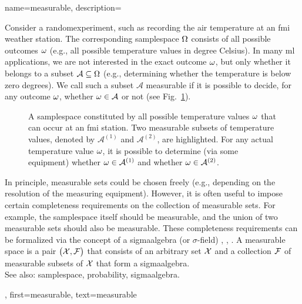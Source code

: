 {name={measurable}, 
	description={Consider a \gls{randomexperiment}, such as recording 
	the air temperature at an \gls{fmi} weather station. The corresponding \gls{samplespace} 
	$\Omega$ consists of all possible outcomes $\omega$ (e.g., 
		all possible temperature values in degree Celsius). In many \gls{ml} 
		applications, we are not interested in the exact outcome $\omega$, but only 
		whether it belongs to a subset $\mathcal{A} \subseteq \Omega$ 
		(e.g., determining whether the temperature is below zero degrees). 
		We call such a subset $\mathcal{A}$ measurable if it is possible to 
		decide, for any outcome $\omega$, whether $\omega \in \mathcal{A}$ 
		or not (see Fig.\ \ref{fig_measurable_dict}). \\
		\begin{figure}[H]
		\begin{center}
			\vspace*{10mm}
			\end{center}
			\caption{A \gls{samplespace} constituted by all possible temperature values $\omega$ 
			that can occur at an \gls{fmi} station. Two measurable subsets of temperature 
			values, denoted by $\mathcal{A}^{(1)}$ and $\mathcal{A}^{(2)}$, are highlighted. For any 
			actual temperature value $\omega$, it is possible to determine (via some equipment) 
			whether $\omega \in \mathcal{A}^{(1)}$ and whether $\omega \in \mathcal{A}^{(2)}$. \label{fig_measurable_dict}} 
		\end{figure}
		In principle, measurable sets could be chosen freely (e.g., depending on the resolution of the 
		measuring equipment). However, it is often useful to impose certain completeness requirements 
		on the collection of measurable sets. For example, the \gls{samplespace} itself should be 
		measurable, and the union of two measurable sets should also be measurable. These completeness 
		requirements can be formalized via the concept of a \gls{sigmaalgebra} (or $\sigma$-field) 
		\cite{RudinBook}, \cite{BillingsleyProbMeasure}, \cite{durrett2010probability}. 
		A measurable space is a pair $\big(\mathcal{X},\mathcal{F}\big)$ that consists of an arbitrary 
		set $\mathcal{X}$ and a collection $\mathcal{F}$ of measurable subsets of $\mathcal{X}$ 
		that form a \gls{sigmaalgebra}. 
		\\
		See also: \gls{samplespace}, \gls{probability}, \gls{sigmaalgebra}.},
	first={measurable},
	text={measurable} 
}


